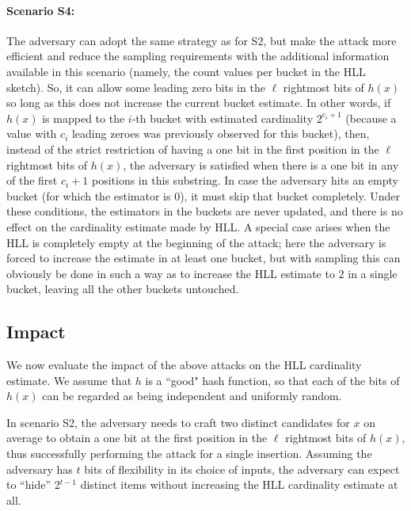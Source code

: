 \documentclass{IEEEtran}
\begin{document}
\noindent\paragraph{Scenario S4:} The adversary can adopt the same strategy as for S2, but make the attack more efficient and reduce the sampling requirements with the additional information available in this scenario (namely, the count values per bucket in the HLL sketch). So, it can allow some leading zero bits in the $\ell$ rightmost bits of $h(x)$ so long as this does not increase the current bucket estimate. In other words, if $h(x)$ is mapped to the $i$-th bucket with estimated cardinality $2^{c_i + 1}$ (because a value with $c_i$ leading zeroes was previously observed for this bucket), then, instead of the strict restriction of having a one bit in the first position in the $\ell$ rightmost bits of $h(x)$, the adversary is satisfied when there is a one bit in any of the first $c_i+1$ positions in this substring. In case the adversary hits an empty bucket (for which the estimator is 0), it must skip that bucket completely. Under these conditions, the estimators in the buckets are never updated, and there is no effect on the cardinality estimate made by HLL.  A special case arises when the HLL is completely empty at the beginning of the attack; here the adversary is forced to increase the estimate in at least one bucket, but with sampling this can obviously be done in such a way as to increase the HLL estimate to $2$ in a single bucket, leaving all the other buckets untouched.

\subsection{Impact}
We now evaluate the impact of the above attacks on the HLL cardinality estimate. We assume that $h$ is a ``good" hash function, so that each of the bits of $h(x)$ can be regarded as being independent and uniformly random.

In scenario S2, the adversary needs to craft two distinct candidates for $x$ on average to obtain a one bit at the first position in the $\ell$ rightmost bits of $h(x)$, thus successfully performing the attack for a single insertion. Assuming the adversary has $t$ bits of flexibility in its choice of inputs, the adversary can expect to ``hide''  2$^{t-1}$ distinct items without increasing the HLL cardinality estimate at all.
\end{document}
